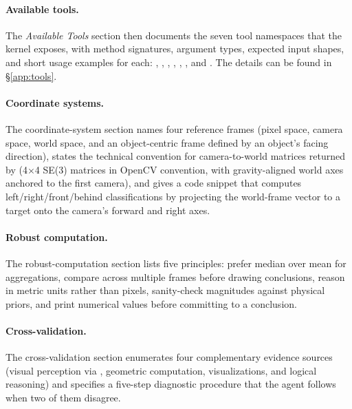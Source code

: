 \paragraph{Available tools.}
The \emph{Available Tools} section then documents the seven tool namespaces that the kernel exposes, with method signatures, argument types, expected input shapes, and short usage examples for each: , , , , , , and . The details can be found in \S\ref{app:tools}.

\paragraph{Coordinate systems.}
The coordinate-system section names four reference frames (pixel space, camera space, world space, and an object-centric frame defined by an object's facing direction), states the technical convention for camera-to-world matrices returned by  (4$\times$4 SE(3) matrices in OpenCV convention, with gravity-aligned world axes anchored to the first camera), and gives a code snippet that computes left/right/front/behind classifications by projecting the world-frame vector to a target onto the camera's forward and right axes.

\paragraph{Robust computation.}
The robust-computation section lists five principles: prefer median over mean for aggregations, compare across multiple frames before drawing conclusions, reason in metric units rather than pixels, sanity-check magnitudes against physical priors, and print numerical values before committing to a conclusion.

\paragraph{Cross-validation.}
The cross-validation section enumerates four complementary evidence sources (visual perception via , geometric computation, visualizations, and logical reasoning) and specifies a five-step diagnostic procedure that the agent follows when two of them disagree.

